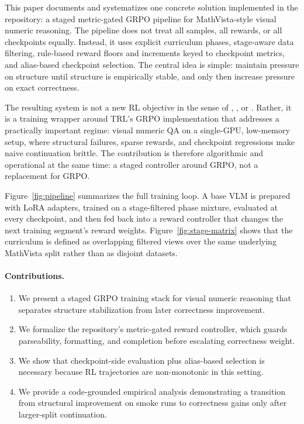 \documentclass{article} %
\begin{document}
This paper documents and systematizes one concrete solution implemented in the repository: a staged metric-gated GRPO pipeline for MathVista-style visual numeric reasoning. The pipeline does not treat all samples, all rewards, or all checkpoints equally. Instead, it uses explicit curriculum phases, stage-aware data filtering, rule-based reward floors and increments keyed to checkpoint metrics, and alias-based checkpoint selection. The central idea is simple: maintain pressure on structure until structure is empirically stable, and only then increase pressure on exact correctness.

The resulting system is not a new RL objective in the sense of \citet{deepseekmath2024}, \citet{wu2025sppo}, or \citet{noukhovitch2025async}. Rather, it is a training wrapper around TRL's GRPO implementation that addresses a practically important regime: visual numeric QA on a single-GPU, low-memory setup, where structural failures, sparse rewards, and checkpoint regressions make naive continuation brittle. The contribution is therefore algorithmic and operational at the same time: a staged controller around GRPO, not a replacement for GRPO.

Figure~\ref{fig:pipeline} summarizes the full training loop. A base VLM is prepared with LoRA adapters, trained on a stage-filtered phase mixture, evaluated at every checkpoint, and then fed back into a reward controller that changes the next training segment's reward weights. Figure~\ref{fig:stage-matrix} shows that the curriculum is defined as overlapping filtered views over the same underlying MathVista split rather than as disjoint datasets.

\paragraph{Contributions.}
\begin{enumerate}[leftmargin=1.2em]
\item We present a staged GRPO training stack for visual numeric reasoning that separates structure stabilization from later correctness improvement.
\item We formalize the repository's metric-gated reward controller, which guards parseability, formatting, and completion before escalating correctness weight.
\item We show that checkpoint-side evaluation plus alias-based selection is necessary because RL trajectories are non-monotonic in this setting.
\item We provide a code-grounded empirical analysis demonstrating a transition from structural improvement on smoke runs to correctness gains only after larger-split continuation.
\end{enumerate}
\end{document}
